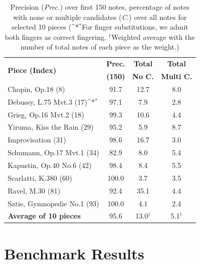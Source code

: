 \documentclass{article}
\begin{document}
\begin{table}
\def\sym#1{\ifmmode^{#1}\else\(^{#1}\)\fi}
\centering
\small

\begin{center}
\begin{tabular*}{\columnwidth}{l@{\extracolsep{\fill}}ccc}
\toprule
\multirow{2}{*}{\textbf{Piece (Index)}} &  \textbf{Prec.} & \textbf{Total}  & \textbf{Total} \\                                     &  \textbf{(150)} & \textbf{No C.} & \textbf{Multi C.}\\
\midrule
Chopin, Op.18 (8) &  91.7 & 12.7 & 8.0 \\
Debussy, L.75 Mvt.3 (17)\sym{*} & 97.1 & 7.9 & 2.8 \\
Grieg, Op.16 Mvt.2 (18) & 99.3 & 10.6 & 4.4 \\
Yiruma, Kiss the Rain (29) & 95.2 & 5.9 & 8.7 \\
Improvisation (31) & 98.6 & 16.7 & 3.0 \\
Schumann, Op.17 Mvt.1 (34) & 82.9 & 8.0 & 5.4 \\
Kapustin, Op.40 No.6 (42) & 98.4 & 8.4 & 5.5 \\
Scarlatti, K.380 (60) & 100.0 & 3.7 & 3.5 \\
Ravel, M.30 (81) & 92.4 & 35.1 & 4.4 \\
Satie, Gymnopedie No.1 (93) & 100.0 & 4.1 & 2.4 \\ 
\midrule
\textbf{Average of 10 pieces} & 95.6 & 13.0$^\dagger$ & 5.1$^\dagger$
\\
\bottomrule
\end{tabular*}
\caption{Precision (\textit{Prec.}) over first 150 notes, percentage of notes with none or multiple candidates (\textit{C.}) over all notes for selected 10 pieces (\sym{*}For finger substitutions, we admit both fingers as correct fingering. $^\dagger$Weighted average with the number of total notes of each piece as the weight.)}
\vspace{-7mm}  
\label{tab:fingering_results}
\end{center}
\end{table}


\section{Benchmark Results}\label{sec:transcription}
\end{document}
